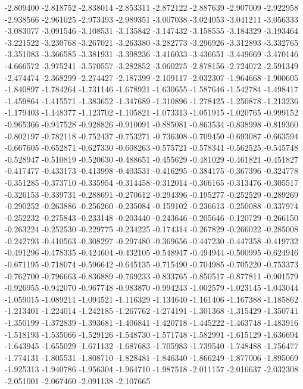 -2.809400
-2.818752
-2.838014
-2.853311
-2.872122
-2.887639
-2.907009
-2.922958
-2.938566
-2.961025
-2.973493
-2.989351
-3.007038
-3.024053
-3.041211
-3.056333
-3.083077
-3.091546
-3.108531
-3.135842
-3.147432
-3.158555
-3.184329
-3.193464
-3.221522
-3.230768
-3.267021
-3.263380
-3.282773
-3.296926
-3.312893
-3.332765
-3.351083
-3.366585
-3.381931
-3.398236
-3.416033
-3.436651
-3.449669
-3.470146
-4.666572
-3.975241
-3.570557
-3.282852
-3.060275
-2.878156
-2.724072
-2.591349
-2.474474
-2.368299
-2.274427
-2.187399
-2.109117
-2.032307
-1.964668
-1.900605
-1.840897
-1.784264
-1.731146
-1.678921
-1.630655
-1.587646
-1.542784
-1.498417
-1.459864
-1.415571
-1.383652
-1.347689
-1.310896
-1.278425
-1.250878
-1.213236
-1.179403
-1.148377
-1.123702
-1.105821
-1.073313
-1.051915
-1.020765
-0.999152
-0.965366
-0.947528
-0.928826
-0.910091
-0.885081
-0.863534
-0.838998
-0.819360
-0.802197
-0.782118
-0.752437
-0.753271
-0.736308
-0.709450
-0.693087
-0.663594
-0.667605
-0.652871
-0.627330
-0.608263
-0.575721
-0.578341
-0.562525
-0.545748
-0.528947
-0.510819
-0.520630
-0.488651
-0.455629
-0.481029
-0.461821
-0.451827
-0.417477
-0.433173
-0.413998
-0.403531
-0.416295
-0.384175
-0.367396
-0.324778
-0.351285
-0.373710
-0.335954
-0.314458
-0.312014
-0.366165
-0.313476
-0.305517
-0.326153
-0.339731
-0.288691
-0.270612
-0.294396
-0.195277
-0.252529
-0.289269
-0.290252
-0.263886
-0.256260
-0.235084
-0.159102
-0.236613
-0.250088
-0.337974
-0.252232
-0.275843
-0.233148
-0.203440
-0.243646
-0.205646
-0.120729
-0.266150
-0.263224
-0.252530
-0.229775
-0.234225
-0.174314
-0.267829
-0.266022
-0.285008
-0.242793
-0.410563
-0.308297
-0.297480
-0.369656
-0.447230
-0.447358
-0.419732
-0.491296
-0.478335
-0.424604
-0.432105
-0.548947
-0.494944
-0.500995
-0.624946
-0.671195
-0.718074
-0.596642
-0.645135
-0.715490
-0.704985
-0.705220
-0.753373
-0.762700
-0.796663
-0.836889
-0.769233
-0.833765
-0.850517
-0.877811
-0.901579
-0.926955
-0.942070
-0.967748
-0.983870
-0.994243
-1.002579
-1.023145
-1.043044
-1.059015
-1.089211
-1.094521
-1.116329
-1.134640
-1.161406
-1.167388
-1.185862
-1.213401
-1.224014
-1.242185
-1.267762
-1.274191
-1.301368
-1.315429
-1.350741
-1.350199
-1.372839
-1.393681
-1.406841
-1.420718
-1.445222
-1.463748
-1.483916
-1.518193
-1.535066
-1.529126
-1.548730
-1.571748
-1.582991
-1.615129
-1.636694
-1.643945
-1.655029
-1.671132
-1.687683
-1.705983
-1.739540
-1.748488
-1.756477
-1.774131
-1.805531
-1.808710
-1.828481
-1.846340
-1.866249
-1.877006
-1.895069
-1.925313
-1.940786
-1.956304
-1.964710
-1.987518
-2.011157
-2.016637
-2.032308
-2.051001
-2.067460
-2.091138
-2.107665
